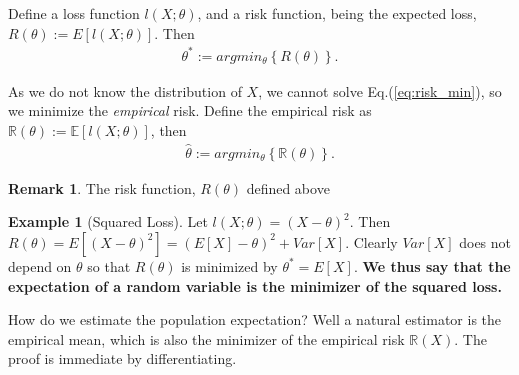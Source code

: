 \documentclass[12pt,a4paper]{article}
\theoremstyle{plain}
\theoremstyle{definition}
\newtheorem{remark}{Remark}
\newtheorem{example}{Example}
\newcommand{\expect}[1]{E[#1]}
\newcommand{\expectn}[1]{\mathbb{E}[#1]}
\newcommand{\loss}{l}
\newcommand{\risk}{R}
\newcommand{\riskn}{\mathbb{R}}
\newcommand{\argmin}[2]{argmin_{#1}\left\{ #2 \right\}}
\begin{document}
Define a loss function $\loss(X;\theta)$, and a risk function, being the expected loss, 
$\risk(\theta):=\expect{\loss(X;\theta)}$. Then 
\begin{align}
\label{eq:risk_min}
 \theta^*:= \argmin{\theta}{\risk(\theta)}.
\end{align}



As we do not know the distribution of $X$, we cannot solve Eq.(\ref{eq:risk_min}), so we minimize the \emph{empirical} risk. 
Define the empirical risk as $\riskn(\theta):=\expectn{\loss(X;\theta)}$, then 
\begin{align}
\label{eq:empirical_risk_min}
 \hat{\theta}:= \argmin{\theta}{\riskn(\theta)}.
\end{align}

\begin{remark}
The risk function, $\risk(\theta)$ defined above
\end{remark}



\begin{example}[Squared Loss]
Let $\loss(X;\theta)=(X-\theta)^2$. Then 
$
	\risk(\theta) = 
	\expect{(X-\theta)^2} = 
	(\expect{X}-\theta)^2 + Var[X]. 
$
Clearly $Var[X]$ does not depend on $\theta$  so that $\risk(\theta)$ is minimized by $\theta^*=\expect{X}$.
\textbf{We thus say that the expectation of a random variable is the minimizer of the squared loss.}

How do we estimate the population expectation? Well a natural estimator is the empirical mean, which is also the minimizer of the empirical risk $\riskn(X)$. The proof is immediate by differentiating. 
\end{example}
\end{document}
